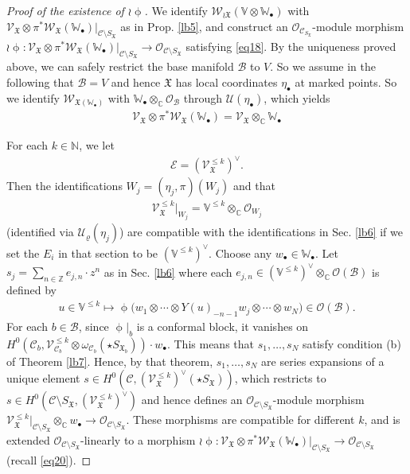 \documentclass[12pt,a4paper,notitlepage]{article}
\theoremstyle{definition}
\theoremstyle{plain}
\newcommand{\fk}{\mathfrak}
\newcommand{\mc}{\mathcal}
\newcommand{\scr}{\mathscr}
\newcommand{\SX}{{S_{\fk X}}}
\newcommand{\blt}{\bullet}
\newcommand{\Vbb}{\mathbb V}
\newcommand{\Wbb}{\mathbb W}
\newcommand{\Cbb}{\mathbb C}
\newcommand{\Nbb}{\mathbb N}
\newcommand{\Zbb}{\mathbb Z}
\newcommand{\SXb}{{S_{\fk X_b}}}
\numberwithin{equation}{section}
\begin{document}
\begin{proof}[Proof  of the existence of $\wr\upphi$]
We identify $\scr W_{\wr\fk X}(\Vbb\otimes\Wbb_\blt)$ with $\scr V_{\fk X}\otimes\pi^*\scr W_{\fk X}(\Wbb_\blt)\big|_{\mc C\setminus\SX}$ as in Prop. \ref{lb5}, and construct  an $\scr O_{\mc C_\SX}$-module morphism $\wr\upphi:\scr V_{\fk X}\otimes\pi^*\scr W_{\fk X}(\Wbb_\blt)\big|_{\mc C\setminus\SX}\rightarrow\scr O_{\mc C\setminus\SX}$ satisfying \eqref{eq18}. By the uniqueness proved above, we can safely restrict the base manifold $\mc B$ to $V$. So we assume in the following that $\mc B=V$ and hence $\fk X$ has local coordinates $\eta_\blt$ at marked points. So we identify $\scr W_{\fk X(\Wbb_\blt)}$ with $\Wbb_\blt\otimes_\Cbb\scr O_{\mc B}$ through $\mc U(\eta_\blt)$, which yields
\begin{align}
\scr V_{\fk X}\otimes\pi^*\scr W_{\fk X}(\Wbb_\blt)=\scr V_{\fk X}\otimes_\Cbb\Wbb_\blt	\label{eq20}
\end{align}

For each $k\in\Nbb$, we let
\begin{align*}
	\scr E=(\scr V_{\fk X}^{\leq k})^\vee.	
\end{align*}
Then the identifications $W_j=(\eta_j,\pi)(W_j)$ and that
\begin{align}
\scr V_{\fk X}^{\leq k}|_{W_j}=\Vbb^{\leq k}\otimes_\Cbb\scr O_{W_j}	\label{eq24}
\end{align}
(identified via $\mc U_\varrho(\eta_j)$) are compatible with the identifications in Sec. \ref{lb6} if we set the $E_i$ in that section to be $(\Vbb^{\leq k})^\vee$. Choose any $w_\blt\in\Wbb_\blt$. Let $s_j=\sum_{n\in\Zbb}e_{j,n}\cdot z^n$ as in Sec. \ref{lb6} where each $e_{j,n}\in (\Vbb^{\leq k})^\vee\otimes_\Cbb\scr O(\mc B)$ is defined by
\begin{align*}
u\in\Vbb^{\leq k}\mapsto\upphi\big(w_1\otimes\cdots\otimes Y(u)_{-n-1}w_j\otimes\cdots\otimes w_N\big)\in\scr O(\mc B).
\end{align*}
For each $b\in\mc B$, since $\upphi|_b$ is a conformal block, it vanishes on $H^0(\mc C_b,\scr V_{\mc C_b}^{\leq k}\otimes\omega_{\mc C_b}(\star\SXb))\cdot w_\blt$. This means that $s_1,\dots,s_N$ satisfy condition (b) of Theorem \ref{lb7}. Hence, by that theorem, $s_1,\dots,s_N$ are series expansions of a unique element $s\in H^0(\mc C,(\scr V_{\fk X}^{\leq k})^\vee(\star\SX))$, which restricts to $s\in H^0(\mc C\setminus\SX,(\scr V_{\fk X}^{\leq k})^\vee)$ and hence defines an $\scr O_{\mc C\setminus\SX}$-module morphism $\scr V_{\fk X}^{\leq k}|_{\mc C\setminus\SX}\otimes_\Cbb w_\blt\rightarrow\scr O_{\mc C\setminus\SX}$. These morphisms are compatible for different $k$, and is extended $\scr O_{\mc C\setminus\SX}$-linearly to a morphism $\wr\upphi:\scr V_{\fk X}\otimes\pi^*\scr W_{\fk X}(\Wbb_\blt)\big|_{\mc C\setminus\SX}\rightarrow \scr O_{\mc C\setminus\SX}$ (recall \eqref{eq20}). 


\end{proof}
\end{document}

